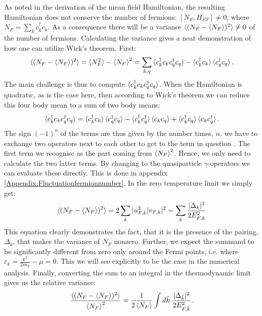 As noted in the derivation of the mean field Hamiltonian, the resulting Hamiltonian does not conserve the number of fermions: $[N_F, H_{FF}] \neq 0 $, where $N_F = \sum_k c^\dagger_k c_k$. As a consequence there will be a variance $\braket{(N_F-\braket{N_F})^2} \neq 0$ of the number of fermions. Calculating the variance gives a neat demonstration of how one can utilize Wick's theorem. First:
\begin{equation}
\braket{(N_F-{\braket{N_F}})^2} = \braket{N_F^2} - \braket{N_F}^2 = \sum_{k,q} \braket{c^\dagger_kc_kc^\dagger_qc_q} - \braket{c^\dagger_kc_k}\braket{c^\dagger_qc_q}. \nonumber
\end{equation} 
The main challenge is thus to compute $\braket{c^\dagger_kc_kc^\dagger_qc_q}$. When the Hamiltonian is quadratic, as is the case here, then according to Wick's theorem we can reduce this four body mean to a sum of two body means:
\begin{equation}
\braket{c^\dagger_kc_kc^\dagger_qc_q} = \braket{c^\dagger_kc_k}\braket{c^\dagger_qc_q} - \braket{c^\dagger_kc^\dagger_q}\braket{c_kc_q} + \braket{c^\dagger_kc_q}\braket{c_kc^\dagger_q}. \nonumber
\end{equation}
The sign $(-1)^{n}$ of the terms are thus given by the number times, $n$, we have to exchange two operators next to each other to get to the term in question \cite[pp. 198-202]{BruusFlensberg}. The first term we recognise as the part coming from $\braket{N_F}^2$. Hence, we only need to calculate the two latter terms. By changing to the quasiparticle $\gamma$-operators we can evaluate these directly. This is done in appendix \ref{Appendix.Fluctuationfermionnumber}. In the zero temperature limit we simply get:
\begin{equation}
\braket{(N_F-{\braket{N_F}})^2} = 2\sum_k |u_{F,k}^2|v_{F,k}|^2 = \sum_k \frac{|\Delta_k|^2}{2E^2_{F,k}}
\end{equation}
This equation clearly demonstrates the fact, that it is the presence of the pairing, $\Delta_k$, that makes the variance of $N_F$ nonzero. Further, we expect the summand to be significantly different from zero only around the Fermi points, i.e. where $\varepsilon_k = \frac{k^2}{2m_F} - \mu = 0$. This we will see explicitly to be the case in the numerical analysis. Finally, converting the sum to an integral in the thermodynamic limit gives us the relative variance:
\begin{equation}
\frac{\braket{(N_F-\braket{N_F})^2}}{\braket{N_F}^2} = \frac{1}{2\braket{N_F}}\int d\tilde{k} \; \frac{|\Delta_{\tilde{k}}|^2}{2E^2_{F,\tilde{k}}}. \nonumber
\end{equation}
